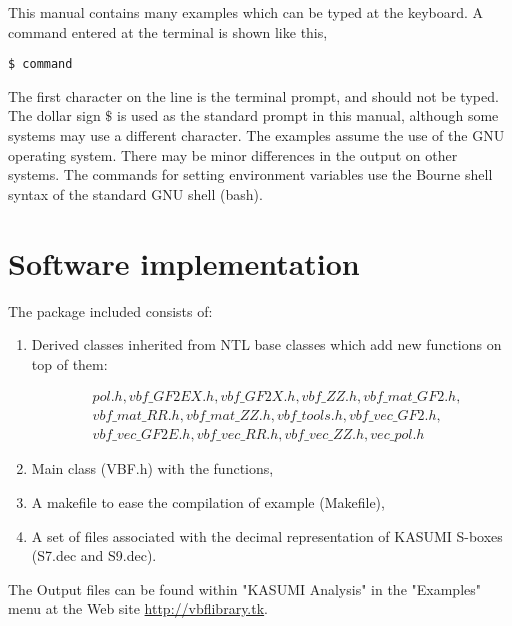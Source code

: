 This manual contains many examples which can be typed at the keyboard. A command entered at the terminal is shown like this,

\begin{verbatim}
$ command
\end{verbatim}

The first character on the line is the terminal prompt, and should not be typed. The dollar sign $\$$ is used as the standard prompt in this manual, although some systems may use a different character.
The examples assume the use of the GNU operating system. There may be minor differences in the output on other systems. The commands for setting environment variables use the Bourne shell syntax of the standard GNU shell (bash).

\section{Software implementation}\label{sec:SW_implementation}

The package included consists of: 

\begin{enumerate}
\item Derived classes inherited from NTL base classes which add new functions on top of them:

\begin{equation}
\begin{array}{ll}
&pol.h, vbf\_GF2EX.h, vbf\_GF2X.h, vbf\_ZZ.h, vbf\_mat\_GF2.h, \\
& vbf\_mat\_RR.h, vbf\_mat\_ZZ.h, vbf\_tools.h, vbf\_vec\_GF2.h,\\ 
& vbf\_vec\_GF2E.h,  vbf\_vec\_RR.h, vbf\_vec\_ZZ.h, vec\_pol.h
\end{array}
\end{equation}

\item Main class (VBF.h) with the functions, 

\item A makefile to ease the compilation of example (Makefile),

\item A set of files associated with the decimal representation of KASUMI \cite{KASUMI:05} S-boxes (S7.dec and S9.dec).
\end{enumerate}

The Output files can be found within "KASUMI Analysis" in the "Examples" menu at the Web site \url{http://vbflibrary.tk}.

